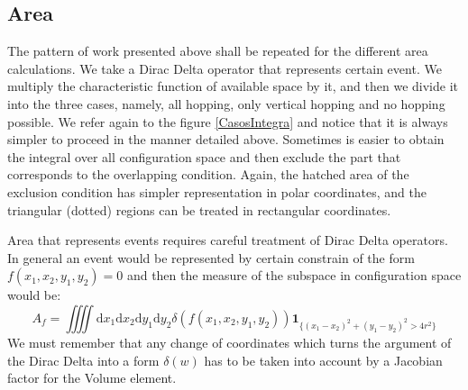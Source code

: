 \documentclass[letterpaper,10pt, jcp, aps]{revtex4-1}
\newcommand{\rd}{\!\mathrm{d}}
\newcommand{\indicator}[1]{\mathbf{1}_{ \{   #1 \} } }
\begin{document}
\subsection{Area}

The pattern of work presented above shall be repeated for the different
area calculations. We take a Dirac Delta operator that represents certain
event. We multiply the characteristic function of available space by it, and
then we divide it into the three cases, namely, all hopping, only vertical hopping
and no hopping possible. We refer again to the figure \ref{CasosIntegra} and notice
that it is always simpler to proceed in the manner detailed above. Sometimes is
easier to obtain 
the integral  over all configuration space and then exclude the part that
corresponds to the overlapping condition. Again, the hatched area of the exclusion
condition has simpler representation in polar coordinates, and the triangular
(dotted) regions can be treated in rectangular coordinates.



Area that represents events  requires careful treatment of Dirac Delta operators.
In general an event would be represented by certain constrain of the form
$f(x_1, x_2 , y_1,y_2) =0 $ and then the measure of the subspace in configuration
space would be:
\begin{equation}
  A_f=\iiiint \rd x_1  \rd x_2  \rd y_1  \rd y_2 \delta(f(x_1, x_2 , y_1,y_2))
  \indicator{(x_1-x_2)^2+(y_1-y_2)^2>4r^2 }
\end{equation}
We must remember that any change of coordinates which turns the argument
of the Dirac Delta into a form $\delta(w)$ has to be taken into account by
a Jacobian factor for the Volume element. 
\end{document}
